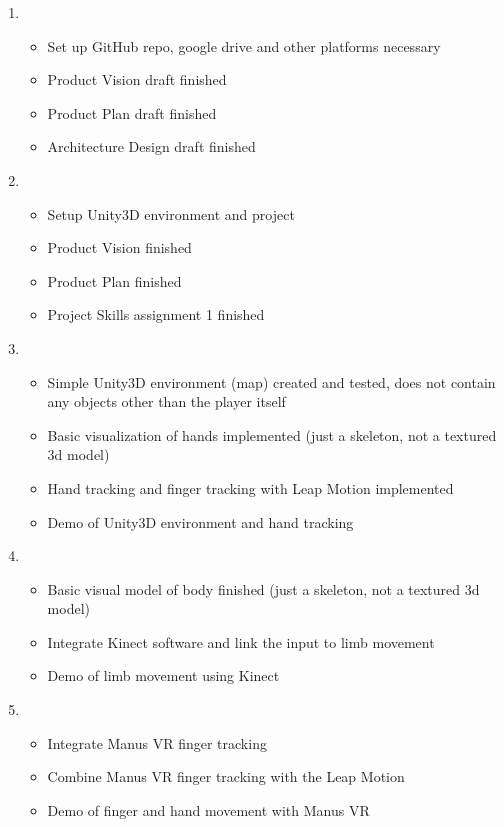 \documentclass[11pt,a4paper]{report}
\begin{document}
\begin{enumerate}[label=\large{ \textbf{Sprint \arabic*}},leftmargin=3\parindent]
\item 
\begin{itemize}
\item Set up GitHub repo, google drive and other platforms necessary
\item Product Vision draft finished
\item Product Plan draft finished
\item Architecture Design draft finished
\end{itemize}
\item 
\begin{itemize}
\item Setup Unity3D environment and project
\item Product Vision finished
\item Product Plan finished
\item Project Skills assignment 1 finished
\end{itemize}
\item 
\begin{itemize}
\item Simple Unity3D environment (map) created and tested, does not contain any objects other than the player itself
\item Basic visualization of hands implemented (just a skeleton, not a textured 3d model)
\item Hand tracking and finger tracking with Leap Motion implemented
\item Demo of Unity3D environment and hand tracking
\end{itemize}
\item 
\begin{itemize}
\item Basic visual model of body finished (just a skeleton, not a textured 3d model)
\item Integrate Kinect software and link the input to limb movement
\item Demo of limb movement using Kinect
\end{itemize}
\item 
\begin{itemize}
\item Integrate Manus VR finger tracking
\item Combine Manus VR finger tracking with the Leap Motion
\item Demo of finger and hand movement with Manus VR
\end{itemize}

\end{enumerate}
\end{document}
